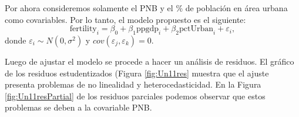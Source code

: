 \documentclass[
]{article}
\newenvironment{Shaded}{\begin{snugshade}}{\end{snugshade}}
\newcommand{\AttributeTok}[1]{\textcolor[rgb]{0.77,0.63,0.00}{#1}}
\newcommand{\DecValTok}[1]{\textcolor[rgb]{0.00,0.00,0.81}{#1}}
\newcommand{\FunctionTok}[1]{\textcolor[rgb]{0.00,0.00,0.00}{#1}}
\newcommand{\NormalTok}[1]{#1}
\newcommand{\OtherTok}[1]{\textcolor[rgb]{0.56,0.35,0.01}{#1}}
\newcommand{\SpecialCharTok}[1]{\textcolor[rgb]{0.00,0.00,0.00}{#1}}
\newcommand{\StringTok}[1]{\textcolor[rgb]{0.31,0.60,0.02}{#1}}
\begin{document}
Por ahora consideremos solamente el PNB y el \% de población en área urbana como covariables. Por lo tanto, el modelo propuesto es el siguiente:
\[
\mbox{fertility}_{i} = \beta_{0} + \beta_{1}\mbox{ppgdp}_{i} + \beta_{2}\mbox{pctUrban}_{i} + \varepsilon_{i},
\]
donde \(\varepsilon_{i}\sim N(0,\sigma^{2})\) y \(cov(\varepsilon_{j},\varepsilon_{k})=0\).

Luego de ajustar el modelo se procede a hacer un análisis de residuos. El gráfico de los residuos estudentizados (Figura \ref{fig:Un11res} muestra que el ajuste presenta problemas de no linealidad y heterocedasticidad. En la Figura \ref{fig:Un11resPartial} de los residuos parciales podemos observar que estos problemas se deben a la covariable PNB.

\begin{Shaded}
\end{Shaded}
\end{document}
